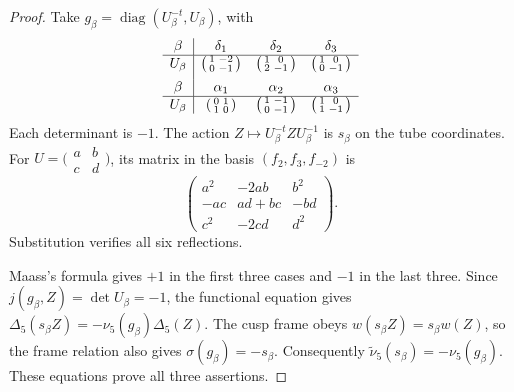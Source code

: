 \begin{proof}
Take \(g_\beta=\operatorname{diag}(U_\beta^{-t},U_\beta)\),
with
\[
\begin{array}{c|ccc}
 \beta&\delta_1&\delta_2&\delta_3\\ \hline
 U_\beta&
 \begin{psmallmatrix}1&-2\\0&-1\end{psmallmatrix}&
 \begin{psmallmatrix}1&0\\2&-1\end{psmallmatrix}&
 \begin{psmallmatrix}1&0\\0&-1\end{psmallmatrix}\\[5pt]
 \beta&\alpha_1&\alpha_2&\alpha_3\\ \hline
 U_\beta&
 \begin{psmallmatrix}0&1\\1&0\end{psmallmatrix}&
 \begin{psmallmatrix}1&-1\\0&-1\end{psmallmatrix}&
 \begin{psmallmatrix}1&0\\1&-1\end{psmallmatrix}
\end{array}
\]
Each determinant is \(-1\).
The action \(Z\mapsto U_\beta^{-t}ZU_\beta^{-1}\)
is \(s_\beta\) on the tube coordinates.
For \(U=\bigl(\begin{smallmatrix}a&b\\c&d\end{smallmatrix}\bigr)\),
its matrix in the basis \((f_2,f_3,f_{-2})\) is
\[
 \begin{pmatrix}
 a^2&-2ab&b^2\\
 -ac&ad+bc&-bd\\
 c^2&-2cd&d^2
 \end{pmatrix}.
\]
Substitution verifies all six reflections.

Maass's formula gives \(+1\) in the first three cases and \(-1\)
in the last three.  Since \(j(g_\beta,Z)=\det U_\beta=-1\),
the functional equation gives
\(\Delta_5(s_\beta Z)=-\nu_5(g_\beta)\Delta_5(Z)\).
The cusp frame obeys \(w(s_\beta Z)=s_\beta w(Z)\), so the frame
relation also gives \(\sigma(g_\beta)=-s_\beta\).
Consequently \(\widetilde\nu_5(s_\beta)=-\nu_5(g_\beta)\).
These equations prove all three assertions.
\end{proof}

